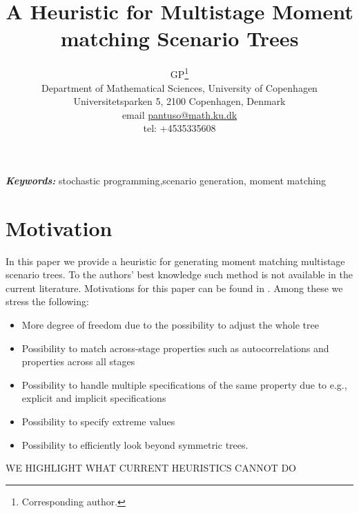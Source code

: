 \documentclass[11pt]{article}
\title{A Heuristic for Multistage Moment matching Scenario Trees}
\author{GP\thanks{Corresponding author.}
\\ Department of Mathematical Sciences, University of Copenhagen
\\ Universitetsparken 5, 2100 Copenhagen, Denmark
\\ email \href{mailto:pantuso@math.ku.dk}{pantuso@math.ku.dk}
\\ tel: +4535335608
}
\date{}
\providecommand{\keywords}[1]{\textbf{\textit{Keywords:}} #1}
\begin{document}
\maketitle
\begin{abstract}
\end{abstract}
\keywords{stochastic programming,scenario generation, moment matching}
\section{Motivation}\label{sec:Intro}
In this paper we provide a heuristic for generating moment matching multistage scenario trees. To the authors' best knowledge such method is not available in the current literature. Motivations for this paper can be found in \citet{HoyW01}. Among these we stress the following:
\begin{itemize}
  \item More degree of freedom due to the possibility to adjust the whole tree
  \item Possibility to match across-stage properties such as autocorrelations and properties across all stages
  \item Possibility to handle multiple specifications of the same property due to e.g., explicit and implicit specifications
  \item Possibility to specify extreme values
  \item Possibility to efficiently look beyond symmetric trees.
\end{itemize}
WE HIGHLIGHT WHAT CURRENT HEURISTICS CANNOT DO




\end{document}
